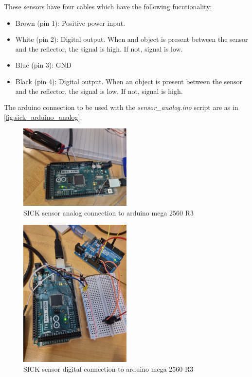 \documentclass[a4paper]{article}
\begin{document}
These sensors have four cables which have the following fucntionality:
\begin{itemize}
	\item Brown (pin 1): Positive power input.
	\item White (pin 2): Digital output. When and object is present between the sensor and the reflector, the signal is high. If not, signal is low.
	\item Blue (pin 3): GND 	
	\item Black (pin 4): Digital output. When an object is present between the sensor and the reflector, the signal is low. If not, signal is high.
\end{itemize}

The arduino connection to be used with the \textit{sensor\_analog.ino} script are as in \autoref{fig:sick_arduino_analog}:

\begin{figure}
	\centering
	\includegraphics[width=0.5\textwidth,angle=180]{SICK_arduino.jpg}
	\caption{SICK sensor analog connection to arduino mega 2560 R3}
	\label{fig:sick_arduino_analog}
\end{figure}

\begin{figure}[h!]
	\centering
	\includegraphics[width=0.5\textwidth]{arduino_tach.jpeg}
	\caption{SICK sensor digital connection to arduino mega 2560 R3}
	\label{fig:sick_arduino_digital}
\end{figure}
\end{document}
